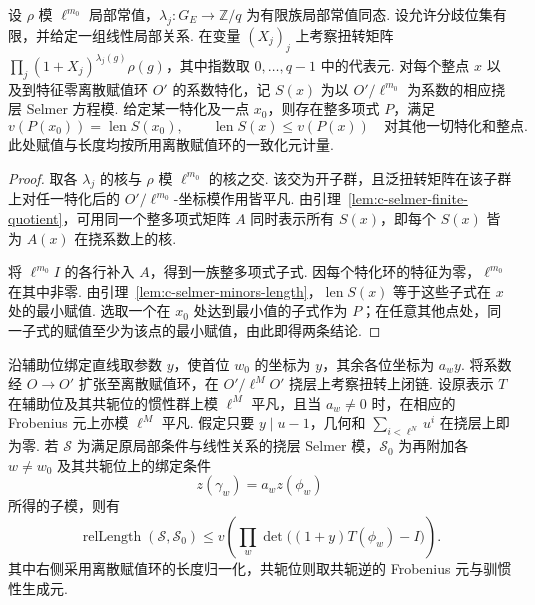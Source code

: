 \begin{lemma}
\label{lem:c-selmer-sharp-polynomial}
\emitthmsource
设 $\rho$ 模 $\ell^{m_0}$ 局部常值，$\lambda_j:G_E\to\mathbb Z/q$ 为有限族局部常值同态.
设允许分歧位集有限，并给定一组线性局部关系.
在变量 $(X_j)_j$ 上考察扭转矩阵 $\prod_j(1+X_j)^{\lambda_j(g)}\rho(g)$，其中指数取 $0,\ldots,q-1$ 中的代表元.
对每个整点 $x$ 以及到特征零离散赋值环 $O'$ 的系数特化，记 $S(x)$ 为以 $O'/\ell^{m_0}$ 为系数的相应挠层 Selmer 方程模.
给定某一特化及一点 $x_0$，则存在整多项式 $P$，满足
\[
 v(P(x_0))=\operatorname{len}S(x_0),
 \qquad
 \operatorname{len}S(x)\le v(P(x))\quad\text{对其他一切特化和整点}.
\]
此处赋值与长度均按所用离散赋值环的一致化元计量.
\end{lemma}
\begin{proof}
取各 $\lambda_j$ 的核与 $\rho$ 模 $\ell^{m_0}$ 的核之交.
该交为开子群，且泛扭转矩阵在该子群上对任一特化后的 $O'/\ell^{m_0}$-坐标模作用皆平凡.
由引理~\ref{lem:c-selmer-finite-quotient}，可用同一个整多项式矩阵 $A$ 同时表示所有 $S(x)$，即每个 $S(x)$ 皆为 $A(x)$ 在挠系数上的核.

将 $\ell^{m_0}I$ 的各行补入 $A$，得到一族整多项式子式.
因每个特化环的特征为零，$\ell^{m_0}$ 在其中非零.
由引理~\ref{lem:c-selmer-minors-length}，$\operatorname{len}S(x)$ 等于这些子式在 $x$ 处的最小赋值.
选取一个在 $x_0$ 处达到最小值的子式作为 $P$；在任意其他点处，同一子式的赋值至少为该点的最小赋值，由此即得两条结论.
\end{proof}

\begin{lemma}
\label{lem:c-selmer-untied-length}
\emitthmsource
沿辅助位绑定直线取参数 $y$，使首位 $w_0$ 的坐标为 $y$，其余各位坐标为 $a_wy$. 将系数经 $O\to O'$ 扩张至离散赋值环，在 $O'/\ell^M O'$ 挠层上考察扭转上闭链. 设原表示 $T$ 在辅助位及其共轭位的惯性群上模 $\ell^M$ 平凡，且当 $a_w\ne0$ 时，在相应的 Frobenius 元上亦模 $\ell^M$ 平凡. 假定只要 $y\mid u-1$，几何和 $\sum_{i<\ell^N}u^i$ 在挠层上即为零. 若 $\mathcal S$ 为满足原局部条件与线性关系的挠层 Selmer 模，$\mathcal S_0$ 为再附加各 $w\ne w_0$ 及其共轭位上的绑定条件
\[
 z(\gamma_w)=a_w z(\phi_w)
\]
所得的子模，则有
\[
 \operatorname{relLength}(\mathcal S,\mathcal S_0)
 \le v\!\left(\prod_w\det\bigl((1+y)T(\phi_w)-I\bigr)\right).
\]
其中右侧采用离散赋值环的长度归一化，共轭位则取共轭逆的 Frobenius 元与驯惯性生成元.
\end{lemma}

